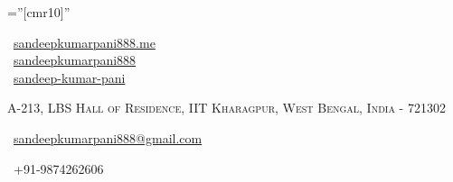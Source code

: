 \documentclass[a4paper,10pt]{extarticle} %
\begin{document}
	
	\pagestyle{empty} %
	
	\font\fb=''[cmr10]'' %

\begin{multicols}{3}
	\normalsize  \faGlobe\ {\href{https://sandeepkumarpani888.github.io/blog/}{sandeepkumarpani888.me}}\\
	\normalsize \faGithub\ {\href{https://github.com/sandeepkumarpani888}{sandeepkumarpani888}}\\
	\normalsize  \faLinkedinSquare\ {\href{https://in.linkedin.com/in/sandeep-pani-3a87117b
			}{sandeep-kumar-pani}}\\
	\columnbreak
	\normalsize\par{\par} %
	\par{\centering\normalsize {\textsc{A-213, LBS Hall of Residence, IIT Kharagpur, West Bengal, India - 721302}}\hfill\par}
	\columnbreak
	\raggedright\hfill\normalsize \faEnvelope\ {\href{mailto:sandeepkumarpani888@gmail.com}{sandeepkumarpani888@gmail.com}}\\
	\raggedright\hfill{\faPhone\ +91-9874262606}
\end{multicols}




\end{document}
